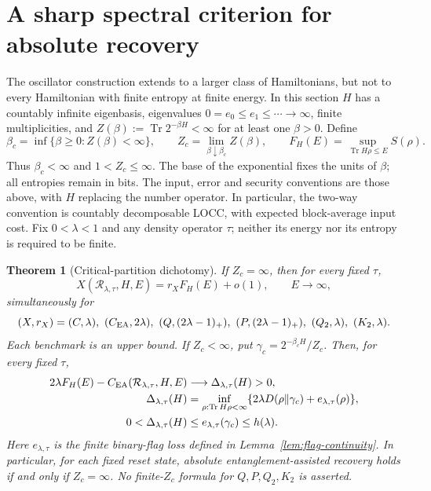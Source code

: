 \documentclass[11pt]{article}
\newtheorem{theorem}{Theorem}
\newcommand{\Tr}{\operatorname{Tr}}
\newcommand{\Rcal}{\mathcal R_{\lambda,\tau}}
\begin{document}
\section{A sharp spectral criterion for absolute recovery}\label{sec:spectral}
The oscillator construction extends to a larger class of Hamiltonians,
but not to every Hamiltonian with finite entropy at finite energy.
In this section $H$ has a countably infinite eigenbasis, eigenvalues
$0=e_0\le e_1\le\cdots\to\infty$, finite multiplicities, and
$Z(\beta):=\Tr 2^{-\beta H}<\infty$ for at least one $\beta>0$.
Define
\[
 \beta_c=\inf\{\beta\ge0:Z(\beta)<\infty\},\qquad
 Z_c=\lim_{\beta\downarrow\beta_c}Z(\beta),\qquad
 F_H(E)=\sup_{\Tr H\rho\le E}S(\rho).
\]
Thus $\beta_c<\infty$ and $1<Z_c\le\infty$. The base of the
exponential fixes the units of $\beta$; all entropies remain in bits.
The input, error and security conventions are those above, with $H$
replacing the number operator. In particular, the two-way convention is
countably decomposable LOCC, with expected block-average input cost.
Fix $0<\lambda<1$ and any density operator $\tau$; neither its energy
nor its entropy is required to be finite.

\begin{theorem}[Critical-partition dichotomy]\label{thm:spectral}
If $Z_c=\infty$, then for every fixed $\tau$,
\begin{equation}\label{eq:spectral-six}
 X(\Rcal,H,E)=r_X F_H(E)+o(1),\qquad E\to\infty,
\end{equation}
simultaneously for
\[
 (X,r_X)=
 (C,\lambda),\ (C_{\rm EA},2\lambda),\
 (Q,(2\lambda-1)_+),\ (P,(2\lambda-1)_+),\
 (Q_2,\lambda),\ (K_2,\lambda).
\]
Each benchmark is an upper bound. If $Z_c<\infty$, put
$\gamma_c=2^{-\beta_cH}/Z_c$. Then, for every fixed $\tau$,
\begin{align}
 2\lambda F_H(E)-C_{\rm EA}(\Rcal,H,E)
   &\longrightarrow\Delta_{\lambda,\tau}(H)>0,
       \label{eq:spectral-defect}\\
 \Delta_{\lambda,\tau}(H)
   &=\inf_{\rho:\Tr H\rho<\infty}
       \{2\lambda D(\rho\Vert\gamma_c)+e_{\lambda,\tau}(\rho)\},
       \label{eq:critical-variational}\\
 0<\Delta_{\lambda,\tau}(H)
   &\le e_{\lambda,\tau}(\gamma_c)\le h(\lambda).
       \label{eq:critical-bounds}
\end{align}
Here $e_{\lambda,\tau}$ is the finite binary-flag loss defined in
Lemma~\ref{lem:flag-continuity}. In particular, for each fixed reset
state, absolute entanglement-assisted recovery holds if and only if
$Z_c=\infty$. No finite-$Z_c$ formula for $Q,P,Q_2,K_2$ is asserted.
\end{theorem}
\end{document}
